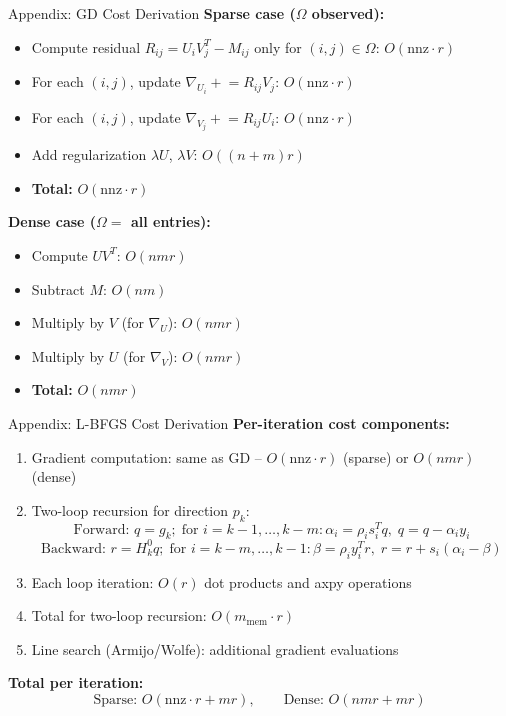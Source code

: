 \documentclass[aspectratio=169,usenames,dvipsnames]{beamer}
\begin{document}
\begin{frame}{Appendix: GD Cost Derivation}
    \textbf{Sparse case ($\Omega$ observed):}
    \begin{itemize}
        \item Compute residual $R_{ij} = U_i V_j^T - M_{ij}$ only for $(i,j)\in\Omega$: $O(\text{nnz} \cdot r)$
        \item For each $(i,j)$, update $\nabla_{U_i} \mathrel{+}= R_{ij} V_j$: $O(\text{nnz} \cdot r)$
        \item For each $(i,j)$, update $\nabla_{V_j} \mathrel{+}= R_{ij} U_i$: $O(\text{nnz} \cdot r)$
        \item Add regularization $\lambda U$, $\lambda V$: $O((n+m)r)$
        \item \textbf{Total:} $O(\text{nnz} \cdot r)$
    \end{itemize}

    \vspace{0.2cm}
    \textbf{Dense case ($\Omega =$ all entries):}
    \begin{itemize}
        \item Compute $UV^T$: $O(n m r)$
        \item Subtract $M$: $O(n m)$
        \item Multiply by $V$ (for $\nabla_U$): $O(n m r)$
        \item Multiply by $U$ (for $\nabla_V$): $O(n m r)$
        \item \textbf{Total:} $O(n m r)$
    \end{itemize}
\end{frame}

\begin{frame}{Appendix: L-BFGS Cost Derivation}
    \textbf{Per-iteration cost components:}
    \begin{enumerate}
        \item Gradient computation: same as GD – $O(\text{nnz} \cdot r)$ (sparse) or $O(n m r)$ (dense)
        \item Two-loop recursion for direction $p_k$:
        \[
        \text{Forward: } q = g_k;\; \text{for } i=k-1,\dots,k-m: \alpha_i = \rho_i s_i^T q,\; q = q - \alpha_i y_i
        \]
        \[
        \text{Backward: } r = H_k^0 q;\; \text{for } i=k-m,\dots,k-1: \beta = \rho_i y_i^T r,\; r = r + s_i(\alpha_i - \beta)
        \]
        \item Each loop iteration: $O(r)$ dot products and axpy operations
        \item Total for two-loop recursion: $O(m_{\text{mem}} \cdot r)$
        \item Line search (Armijo/Wolfe): additional gradient evaluations
    \end{enumerate}
    
    \vspace{0.1cm}
    \textbf{Total per iteration:}
    \[
    \text{Sparse: } O(\text{nnz} \cdot r + m r), \qquad
    \text{Dense: } O(n m r + m r)
    \]
\end{frame}
\end{document}
